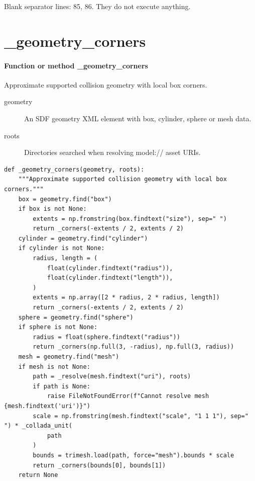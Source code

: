 \documentclass[11pt,a4paper]{book}
\begin{document}
Blank separator lines: 85, 86. They do not execute anything.

\section{\_geometry\_corners}

\paragraph{Function or method \_geometry\_corners}
Approximate supported collision geometry with local box corners.

\begin{description}
\item[geometry] An SDF geometry XML element with box, cylinder, sphere or mesh data.
\item[roots] Directories searched when resolving model:// asset URIs.
\end{description}

\begin{lstlisting}[firstnumber=87]
def _geometry_corners(geometry, roots):
    """Approximate supported collision geometry with local box corners."""
    box = geometry.find("box")
    if box is not None:
        extents = np.fromstring(box.findtext("size"), sep=" ")
        return _corners(-extents / 2, extents / 2)
    cylinder = geometry.find("cylinder")
    if cylinder is not None:
        radius, length = (
            float(cylinder.findtext("radius")),
            float(cylinder.findtext("length")),
        )
        extents = np.array([2 * radius, 2 * radius, length])
        return _corners(-extents / 2, extents / 2)
    sphere = geometry.find("sphere")
    if sphere is not None:
        radius = float(sphere.findtext("radius"))
        return _corners(np.full(3, -radius), np.full(3, radius))
    mesh = geometry.find("mesh")
    if mesh is not None:
        path = _resolve(mesh.findtext("uri"), roots)
        if path is None:
            raise FileNotFoundError(f"Cannot resolve mesh {mesh.findtext('uri')}")
        scale = np.fromstring(mesh.findtext("scale", "1 1 1"), sep=" ") * _collada_unit(
            path
        )
        bounds = trimesh.load(path, force="mesh").bounds * scale
        return _corners(bounds[0], bounds[1])
    return None


\end{lstlisting}
\end{document}
